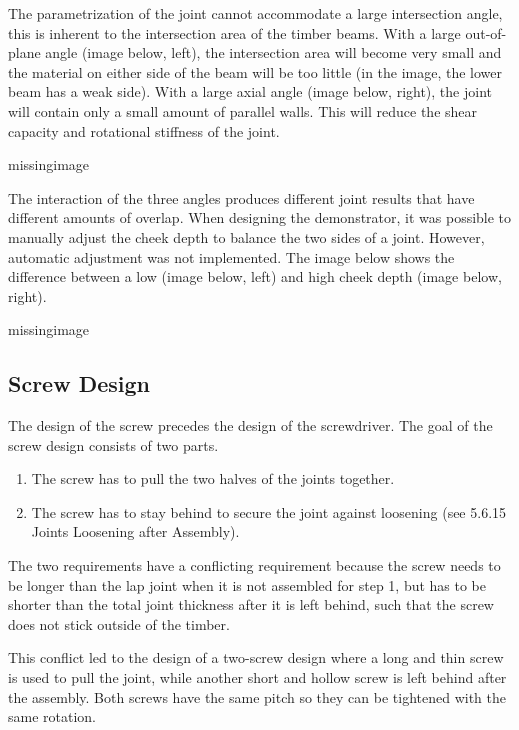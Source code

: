The parametrization of the joint cannot accommodate a large intersection angle, this is inherent to the intersection area of the timber beams. With a large out-of-plane angle (image below, left), the intersection area will become very small and the material on either side of the beam will be too little (in the image, the lower beam has a weak side). With a large axial angle (image below, right), the joint will contain only a small amount of parallel walls. This will reduce the shear capacity and rotational stiffness of the joint.

missingimage

The interaction of the three angles produces different joint results that have different amounts of overlap. When designing the demonstrator, it was possible to manually adjust the cheek depth to balance the two sides of a joint. However, automatic adjustment was not implemented. The image below shows the difference between a low (image below, left) and high cheek depth (image below, right).

missingimage

\subsection{Screw Design}
\label{subsection:exploration-4-screw-design}

The design of the screw precedes the design of the screwdriver. The goal of the screw design consists of two parts. 

\begin{enumerate}
    \item The screw has to pull the two halves of the joints together.
    \item The screw has to stay behind to secure the joint against loosening (see 5.6.15 Joints Loosening after Assembly).

\end{enumerate}
The two requirements have a conflicting requirement because the screw needs to be longer than the lap joint when it is not assembled for step 1, but has to be shorter than the total joint thickness after it is left behind, such that the screw does not stick outside of the timber. 

This conflict led to the design of a two-screw design where a long and thin screw is used to pull the joint, while another short and hollow screw is left behind after the assembly. Both screws have the same pitch so they can be tightened with the same rotation.

